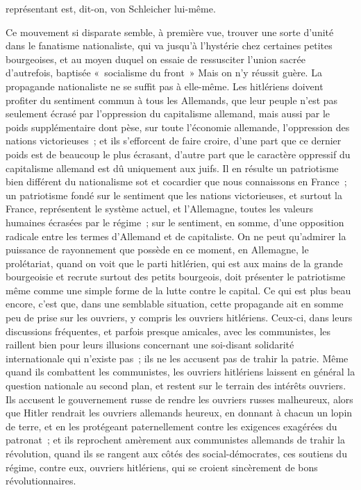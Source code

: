 \documentclass[french,twoside]{book} %
\begin{document}
représentant est, dit-on, von Schleicher lui-même.\par
Ce mouvement si disparate semble, à première vue, trouver une sorte d'unité dans le fanatisme nationaliste, qui va jusqu'à l'hystérie chez certaines petites bourgeoises, et au moyen duquel on essaie de ressusciter l'union sacrée d'autrefois, baptisée « socialisme du front » Mais on n'y réussit guère. La propagande nationaliste ne se suffit pas à elle-même. Les hitlériens doivent profiter du sentiment commun à tous les Allemands, que leur peuple n'est pas seulement écrasé par l'oppression du capitalisme allemand, mais aussi par le poids supplémentaire dont pèse, sur toute l'économie allemande, l'oppression des nations victorieuses ; et ils s'efforcent de faire croire, d'une part que ce dernier poids est de beaucoup le plus écrasant, d'autre part que le caractère oppressif du capitalisme allemand est dû uniquement aux juifs. Il en résulte un patriotisme bien différent du nationalisme sot et cocardier que nous connais­sons en France ; un patriotisme fondé sur le sentiment que les nations victo­rieuses, et surtout la France, représentent le système actuel, et l'Allemagne, toutes les valeurs humaines écrasées par le régime ; sur le sentiment, en somme, d'une opposition radicale entre les termes d'Allemand et de capita­liste. On ne peut qu'admirer la puissance de rayonnement que possède en ce moment, en Allemagne, le prolétariat, quand on voit que le parti hitlérien, qui est aux mains de la grande bourgeoisie et recrute surtout des petits bourgeois, doit présenter le patriotisme même comme une simple forme de la lutte contre le capital. Ce qui est plus beau encore, c'est que, dans une semblable situation, cette propagande ait en somme peu de prise sur les ouvriers, y compris les ouvriers hitlériens. Ceux-ci, dans leurs discussions fréquentes, et parfois presque amicales, avec les communistes, les raillent bien pour leurs illusions concernant une soi-disant solidarité internationale qui n'existe pas ; ils ne les accusent pas de trahir la patrie. Même quand ils combattent les communistes, les ouvriers hitlériens laissent en général la question nationale au second plan, et restent sur le terrain des intérêts ouvriers. Ils accusent le gouvernement russe de rendre les ouvriers russes malheureux, alors que Hitler rendrait les ouvriers allemands heureux, en donnant à chacun un lopin de terre, et en les protégeant paternellement contre les exigences exagérées du patronat ; et ils reprochent amèrement aux communistes allemands de trahir la révolution, quand ils se rangent aux côtés des social-démocrates, ces soutiens du régime, contre eux, ouvriers hitlériens, qui se croient sincèrement de bons révolution­naires.\par
\end{document}
